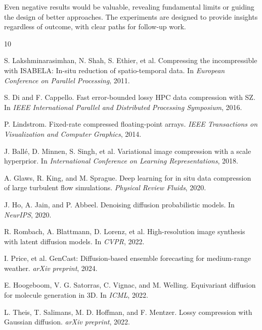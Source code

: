 \documentclass[11pt]{article}
\begin{document}
Even negative results would be valuable, revealing fundamental limits or guiding the design of better approaches. The experiments are designed to provide insights regardless of outcome, with clear paths for follow-up work.


\begin{thebibliography}{10}

S. Lakshminarasimhan, N. Shah, S. Ethier, et al.
\newblock Compressing the incompressible with ISABELA: In-situ reduction of spatio-temporal data.
\newblock In \textit{European Conference on Parallel Processing}, 2011.

S. Di and F. Cappello.
\newblock Fast error-bounded lossy HPC data compression with SZ.
\newblock In \textit{IEEE International Parallel and Distributed Processing Symposium}, 2016.

P. Lindstrom.
\newblock Fixed-rate compressed floating-point arrays.
\newblock \textit{IEEE Transactions on Visualization and Computer Graphics}, 2014.

J. Ballé, D. Minnen, S. Singh, et al.
\newblock Variational image compression with a scale hyperprior.
\newblock In \textit{International Conference on Learning Representations}, 2018.

A. Glaws, R. King, and M. Sprague.
\newblock Deep learning for in situ data compression of large turbulent flow simulations.
\newblock \textit{Physical Review Fluids}, 2020.

J. Ho, A. Jain, and P. Abbeel.
\newblock Denoising diffusion probabilistic models.
\newblock In \textit{NeurIPS}, 2020.

R. Rombach, A. Blattmann, D. Lorenz, et al.
\newblock High-resolution image synthesis with latent diffusion models.
\newblock In \textit{CVPR}, 2022.

I. Price, et al.
\newblock GenCast: Diffusion-based ensemble forecasting for medium-range weather.
\newblock \textit{arXiv preprint}, 2024.

E. Hoogeboom, V. G. Satorras, C. Vignac, and M. Welling.
\newblock Equivariant diffusion for molecule generation in 3D.
\newblock In \textit{ICML}, 2022.

L. Theis, T. Salimans, M. D. Hoffman, and F. Mentzer.
\newblock Lossy compression with Gaussian diffusion.
\newblock \textit{arXiv preprint}, 2022.


\end{thebibliography}
\end{document}
